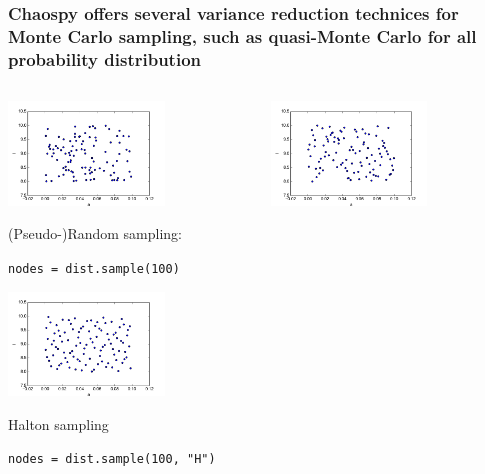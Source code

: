 \documentclass[handout]{beamer}
\begin{document}
\begin{frame}[fragile]
 \frametitle{Chaospy offers several variance reduction technices for Monte Carlo sampling,
             such as quasi-Monte Carlo for all probability distribution}
 \begin{columns}
     \begin{center}
                \includegraphics[width=0.65\textwidth]{samples.png}

                (Pseudo-)Random sampling:

                \scriptsize
                \verb;nodes = dist.sample(100);
                \normalsize

                \includegraphics[width=0.65\textwidth]{samples_H.png}

                Halton sampling

                \scriptsize
                \verb;nodes = dist.sample(100, "H");
                \normalsize

     \end{center}
     \begin{center}
                  \includegraphics[width=0.65\textwidth]{samples_L.png}


\end{center}
\end{columns}
\end{frame}
\end{document}
